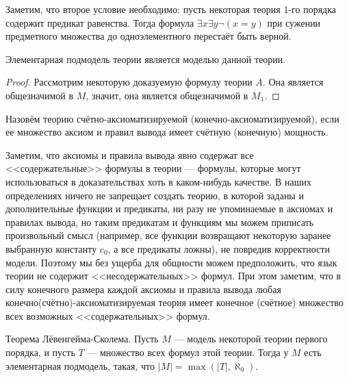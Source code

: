 Заметим, что второе условие необходимо: пусть некоторая теория 1-го 
порядка содержит предикат равенства. Тогда формула
$\exists x \exists y \neg (x = y)$ при сужении предметного множества до
одноэлементного перестаёт быть верной.

\begin{lemma}
Элементарная подмодель теории является моделью данной теории.
\end{lemma}

\begin{proof}
Рассмотрим некоторую доказуемую формулу теории $A$. Она является общезначимой 
в $M$, значит, она является общезначимой в $M_1$. 
\end{proof}

\begin{definition}
Назовём теорию счётно-аксиоматизируемой (конечно-аксио\-ма\-ти\-зи\-руемой), если ее 
множество аксиом и правил вывода имеет счётную (конечную) мощность.
\end{definition}

Заметим, что аксиомы и правила вывода явно содержат все <<содержательные>> 
формулы в теории --- формулы, которые могут использоваться в доказательствах
хоть в каком-нибудь качестве. 
В наших определениях ничего не запрещает создать теорию, в которой 
заданы и дополнительные функции и предикаты, ни разу не упоминаемые в 
аксиомах и правилах вывода, но таким предикатам и 
функциям мы можем приписать произвольный смысл (например, все функции 
возвращают некоторую заранее выбранную константу $c_0$, а все предикаты 
ложны), не повредив корректности модели. Поэтому мы без ущерба для
общности можем предположить, что язык теории не содержит 
<<несодержательных>> формул.
При этом заметим, что в силу конечного размера каждой аксиомы и правила
вывода любая конечно(счётно)-аксиоматизируемая теория имеет
конечное (счётное) множество всех возможных <<содержательных>> формул.

\begin{theorem}{Теорема Лёвенгейма-Сколема.}
Пусть $M$ --- модель некоторой теории первого порядка, и пусть $T$ ---
множество всех формул этой теории. Тогда у $M$ есть элементарная
подмодель, такая, что $|M| = \max(|T|, \aleph_0)$.
\end{theorem}

